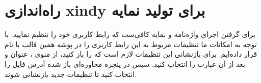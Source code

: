 \section{راه‌اندازی xindy برای تولید نمایه}
برای گرفتن اجرای واژه‌نامه و نمایه کافی‌ست که رابط کاربری خود را تنظیم نمایید. با توجه به امکانات  ما تنظیمات مربوط به این رابط کاربری را در پوشه  همین قالب با نام  قرار داده‌ایم. برای بازنشانی این تنظیمات لازم است که  را باز کنید، از منوی ، عنوان  و بعد از آن عبارت  را انتخاب کنید. سپس در پنجره محاوره‌ای باز شده آدرس فایل  را انتخاب کنید تا تنظیمات جدید بازنشانی شوند. 

